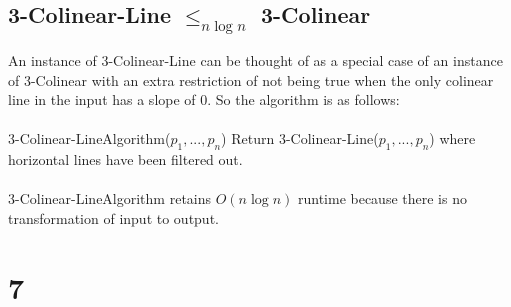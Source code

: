 \documentclass[letterpaper,notitlepage,twoside]{article}
\newcommand\tab[1][1cm]{\hspace*{#1}} %
\begin{document}
\subsection*{3-Colinear-Line $\leq_{n \log n}$  3-Colinear}
An instance of 3-Colinear-Line can be thought of as a special case of an instance of 3-Colinear with an extra restriction of not being true when the only colinear line in the input has a slope of 0. So the algorithm is as follows:
\\\\
3-Colinear-LineAlgorithm($p_1,...,p_n$)
\tab Return 3-Colinear-Line($p_1,...,p_n$) where horizontal lines have been filtered out.
\\\\
3-Colinear-LineAlgorithm retains $O(n \log n)$ runtime because there is no transformation of input to output.

\section*{7}
\end{document}
